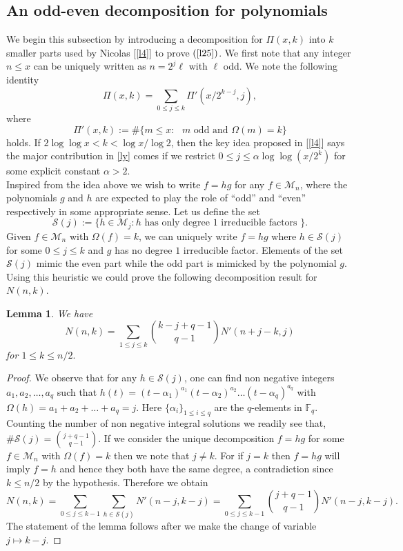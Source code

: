 \documentclass[12pt]{amsart}
\numberwithin{equation}{section}
\newtheorem{Lemma}[theorem]{Lemma}
\theoremstyle{remark}
\theoremstyle{remark}
\theoremstyle{definition}
\begin{document}
\subsection{An odd-even decomposition for polynomials}
We begin this subsection by introducing a decomposition for $\Pi(x,k)$ into $k$ smaller parts used by Nicolas [\ref{l4}] to prove $(\ref{l25})$. We first note that any integer $n\leqslant x$ can be uniquely written as $n=2^j\ell$ with $\ell$ odd. We note the following identity 
\begin{equation}\label{ly}
\Pi(x,k)=\sum\limits_{0\leqslant j\leqslant k}\Pi'(x/2^{k-j},j),
\end{equation}
where \[\Pi'(x,k):= \#\bigg \{m\leqslant x:\text{ $m$ odd and }\Omega(m)=k \bigg \}\]
holds. If $2\log\log x<k<\log x/\log 2$, then the key idea proposed in [\ref{l4}] says the major contribution in \eqref{ly} comes if we restrict $0\leqslant j\leqslant \alpha\log\log (x/2^k)$ for some explicit constant $\alpha>2$.\\
Inspired from the idea above we wish to write $f=hg$ for any $f\in\mathcal{M}_n$, where the polynomials $g$ and $h$ are expected to play the role of ``odd'' and ``even'' respectively in some appropriate sense. Let us define the set
$$\mathcal{S}(j):=\bigg \{ h\in\mathcal{M}_j: h\text{ has only degree }1\text{ irreducible factors }\bigg \}.$$
Given $f\in\mathcal{M}_n$ with $\Omega(f)=k$, we can uniquely write $f=hg$ where $h\in\mathcal{S}(j)$ for some $0\leqslant j\leqslant k$ and $g$ has no degree $1$ irreducible factor. Elements of the set $\mathcal{S}(j)$ mimic the even part while the odd part is mimicked by the polynomial $g$. Using this heuristic we could prove the following decomposition result for $N(n,k)$.
\begin{Lemma}\label{led}
We have \[N(n,k)=\displaystyle\sum_{1\leqslant j\leqslant k} \binom{k-j+q-1}{q-1}N'(n+j-k,j)\] for $1\leqslant k\leqslant n/2.$
\end{Lemma}
\begin{proof}
We observe that for any $h\in \mathcal{S}(j)$, one can find non negative integers $a_1,a_2,\ldots,a_q$ such that $h(t)=(t-\alpha_1)^{a_1}(t-\alpha_2)^{a_2}\ldots(t-\alpha_q)^{a_q}$ with $\Omega(h)=a_1+a_2+\ldots+a_q=j$.
Here $\{\alpha_i\}_{1\leqslant i\leqslant q}$ are the $q$-elements in $\mathbb{F}_q.$ Counting the number of non negative integral solutions we readily see that, $\#\mathcal{S}(j)=\binom{j+q-1}{q-1}.$ If we consider the unique decomposition $f=hg$ for some $f\in\mathcal{M}_n$ with $\Omega(f)=k$ then we note that $j\neq k$. For if $j=k$ then $f=hg$ will imply $f=h$ and hence they both have the same degree, a contradiction since $k\leqslant n/2$ by the hypothesis. Therefore we obtain $$N(n,k)=\displaystyle\sum\limits_{0\leqslant j\leqslant k-1}\displaystyle\sum\limits_{h\in\mathcal{S}(j)}N'(n-j,k-j)=\displaystyle\sum\limits_{0\leqslant j\leqslant k-1}\binom{j+q-1}{q-1}N'(n-j,k-j).$$
The statement of the lemma follows after we make the change of variable $j\mapsto k-j.$
\end{proof}
\end{document}
